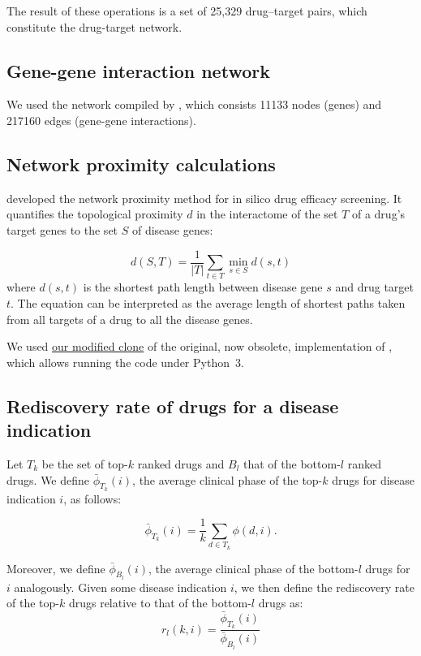 \documentclass[letterpaper]{article}
\begin{document}
The result of these operations is a set of 25,329 drug--target pairs, which constitute
the drug-target network.

\subsection{Gene-gene interaction network}

We used the network compiled by \cite{Cheng2019}, which consists 11133 nodes
(genes) and 217160 edges (gene-gene interactions).

\subsection{Network proximity calculations}

\cite{Guney2016} developed the network proximity method for in silico drug efficacy screening.  It
quantifies the topological proximity $d$ in the interactome of the set $T$ of a drug's target genes
to the set $S$ of disease genes: 

\begin{equation}
  d(S, T) = \frac{1}{|T|}\sum_{t \in T} \min_{s \in S} d(s, t)
\end{equation}
where $d(s,t)$ is the shortest path length between disease gene $s$ and drug
target $t$.  The equation can be interpreted as the average length of shortest
paths taken from all targets of a drug to all the disease genes.

We used \href{https://github.com/attilagk/guney_code}{our modified clone} of
the original, now obsolete, implementation of \cite{Guney2016}, which allows
running the code under Python~3.

\subsection{Rediscovery rate of drugs for a disease indication}

Let $T_k$ be the set of top-$k$ ranked drugs and $B_l$ that of the bottom-$l$
ranked drugs.  We define $\bar{\phi}_{T_k}(i)$, the average clinical phase of the top-$k$ drugs for
disease indication $i$, as follows:

\begin{equation}
  \bar{\phi}_{T_k}(i) = \frac{1}{k} \sum_{d \in T_k} \phi(d, i).
  \label{eq:phase-top-k}
\end{equation}

Moreover, we define $\bar{\phi}_{B_l}(i)$, the average clinical phase of the bottom-$l$
drugs for $i$ analogously.  Given some disease indication $i$, we then define the rediscovery rate of the top-$k$
drugs relative to that of the bottom-$l$ drugs as:
\begin{equation}
  r_l(k, i) = \frac{\bar{\phi}_{T_k}(i)}{\bar{\phi}_{B_l}(i)}
  \label{eq:rediscovery-rate}
\end{equation}
\end{document}
